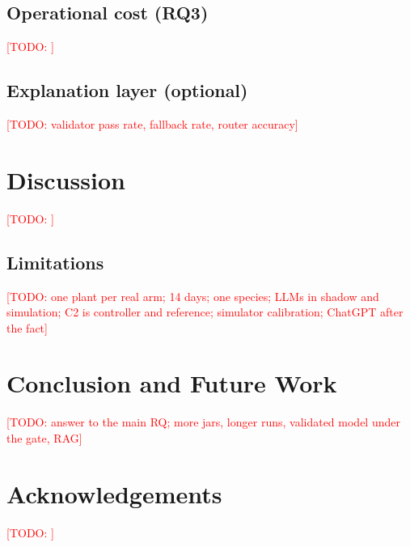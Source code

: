 \documentclass[10pt,twocolumn]{article}
\newcommand{\todo}[1]{\textcolor{red}{[TODO: #1]}}
\begin{document}
\subsection{Operational cost (RQ3)}
\todo{}
\subsection{Explanation layer (optional)}
\todo{validator pass rate, fallback rate, router accuracy}

\section{Discussion}\label{sec:discussion}
\todo{}
\subsection*{Limitations}
\todo{one plant per real arm; 14 days; one species; LLMs in shadow and simulation; C2 is controller and reference; simulator calibration; ChatGPT after the fact}

\section{Conclusion and Future Work}\label{sec:conclusion}
\todo{answer to the main RQ; more jars, longer runs, validated model under the gate, RAG}

\section*{Acknowledgements}
\todo{}




\end{document}
